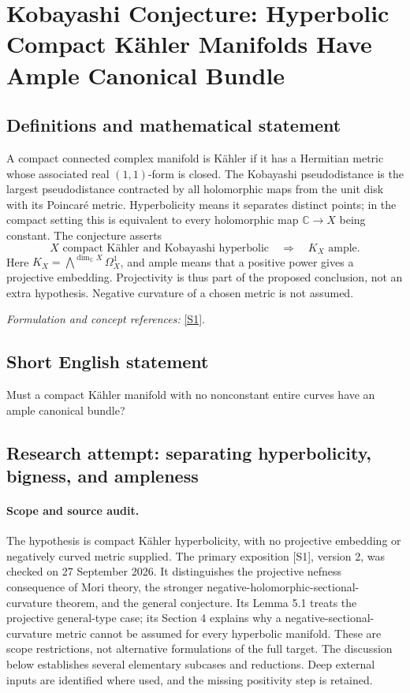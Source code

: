 \documentclass[11pt]{article}
\begin{document}
\section*{\texorpdfstring{Kobayashi Conjecture: Hyperbolic Compact Kähler Manifolds Have Ample Canonical Bundle}{Kobayashi Conjecture: Hyperbolic Compact Kähler Manifolds Have Ample Canonical Bundle}}\label{statement}
\subsection{Definitions and mathematical statement}
A compact connected complex manifold is K\"ahler if it has a Hermitian metric whose associated real $(1,1)$-form is closed. The Kobayashi pseudodistance is the largest pseudodistance contracted by all holomorphic maps from the unit disk with its Poincar\'e metric. Hyperbolicity means it separates distinct points; in the compact setting this is equivalent to every holomorphic map ${\mathbb{C}}\to X$ being constant. The conjecture asserts
\[
 X\text{ compact K\"ahler and Kobayashi hyperbolic}
 \quad\Longrightarrow\quad K_X\text{ ample}.
\]
Here $K_X=\bigwedge^{\dim_{{\mathbb{C}}} X}\Omega_X^1$, and ample means that a positive power gives a projective embedding. Projectivity is thus part of the proposed conclusion, not an extra hypothesis. Negative curvature of a chosen metric is not assumed.
\par\smallskip\textit{Formulation and concept references:} \href{https://arxiv.org/pdf/2011.11379}{[S1]}.

\subsection{Short English statement}
Must a compact K\"ahler manifold with no nonconstant entire curves have an ample canonical bundle?
\subsection{Research attempt: separating hyperbolicity, bigness, and ampleness}
\paragraph{Scope and source audit.}
The hypothesis is compact K\"ahler hyperbolicity, with no projective embedding or negatively curved metric supplied. The primary exposition [S1], version 2, was checked on 27 September 2026. It distinguishes the projective nefness consequence of Mori theory, the stronger negative-holomorphic-sectional-curvature theorem, and the general conjecture. Its Lemma 5.1 treats the projective general-type case; its Section 4 explains why a negative-sectional-curvature metric cannot be assumed for every hyperbolic manifold. These are scope restrictions, not alternative formulations of the full target. The discussion below establishes several elementary subcases and reductions. Deep external inputs are identified where used, and the missing positivity step is retained.
\end{document}
